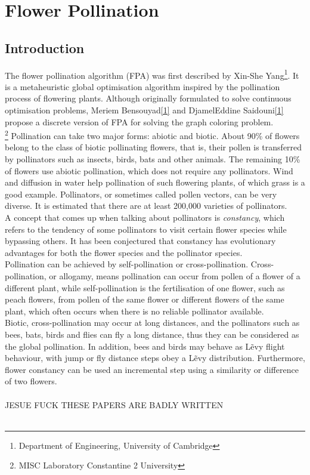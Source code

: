 \section{Flower Pollination}


\subsection{Introduction}

The flower pollination algorithm\cite{yang2012flower} (FPA) was first described by Xin-She Yang\footnote{Department of Engineering, University of Cambridge}. It is a metaheuristic global optimisation algorithm inspired by the pollination process of flowering plants. Although originally formulated to solve continuous optimisation problems, Meriem Bensouyad\ref{1} and DjamelEddine Saidouni\ref{1} propose a discrete version of FPA for solving the graph coloring problem\cite{7175923}.\\
\footnote{MISC Laboratory Constantine 2 University}\label{1}
Pollination can take two major forms: abiotic and biotic. About 90\% of flowers belong to the class of biotic pollinating flowers, that is, their pollen is transferred by pollinators such as insects, birds, bats and other animals. The remaining 10\% of flowers use abiotic pollination, which does not require any pollinators. Wind and diffusion in water help pollination of such flowering plants, of which grass is a good example. Pollinators, or sometimes called pollen vectors, can be very diverse. It is estimated that there are at least 200,000 varieties of pollinators.\\
A concept that comes up when talking about pollinators is \emph{constancy}, which refers to the tendency of some pollinators to visit certain flower species while bypassing others. It has been conjectured that constancy has evolutionary advantages for both the flower species and the pollinator species.\\
Pollination can be achieved by self-pollination or cross-pollination. Cross-pollination, or allogamy, means pollination can occur from pollen of a flower of a different plant, while self-pollination is the fertilisation of one flower, such as peach flowers, from pollen of the same flower or different flowers of the same plant, which often occurs when there is no reliable pollinator available. %
\\
Biotic, cross-pollination may occur at long distances, and the pollinators such as bees, bats, birds and flies can fly a long distance, thus they can be considered as the global pollination. In addition, bees and birds may behave as L\~evy flight behaviour, with jump or fly distance steps obey a L\~evy distribution. Furthermore, flower constancy can be used an incremental step using a similarity or difference of two flowers.\\~\\
JESUE FUCK THESE PAPERS ARE BADLY WRITTEN\\~\\

